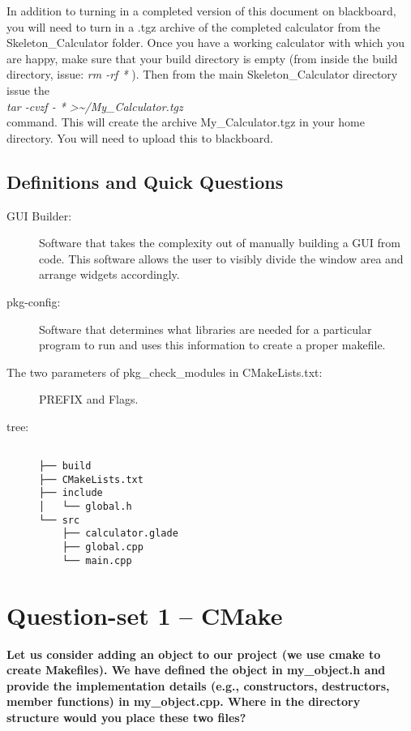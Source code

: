 \documentclass{article}
\begin{document}
In addition to turning in a completed version of this document on blackboard, you will need to turn in a .tgz archive of the completed calculator from the Skeleton\_Calculator folder. Once you have a working calculator with which you are happy, make sure that your build directory is empty (from inside the build directory, issue: \textit{rm -rf * }). Then from the main Skeleton\_Calculator directory issue the\\ \textit{tar -cvzf - * \textgreater\textasciitilde/My\_Calculator.tgz} \\
command. This will create the archive My\_Calculator.tgz in your home directory. You will need to upload this to blackboard.

\subsection{Definitions and Quick Questions}
\label{definitions}
\begin{description}
\item[GUI Builder:]
Software that takes the complexity out of manually building a GUI from code. This software allows the user to visibly divide the window area and arrange widgets accordingly.   
\item[pkg-config:]
Software that determines what libraries are needed for a particular program to run and uses this information to create a proper makefile.
\item[The two parameters of pkg\_check\_modules in CMakeLists.txt:]
PREFIX and Flags.
\item[tree:]
\begin{frame}

\begin{lstlisting}[style=ascii-tree]

├── build
├── CMakeLists.txt
├── include
│   └── global.h
└── src
    ├── calculator.glade
    ├── global.cpp
    └── main.cpp
\end{lstlisting}
\end{frame}

\item[]
\end{description} 

\section{Question-set 1 -- CMake}
\textbf{Let us consider adding an object to our project (we use cmake to create Makefiles). We have defined the object in my\_object.h and provide the implementation details (e.g., constructors, destructors, member functions) in my\_object.cpp. Where in the directory structure would you place these two files? }\\
\end{document}
